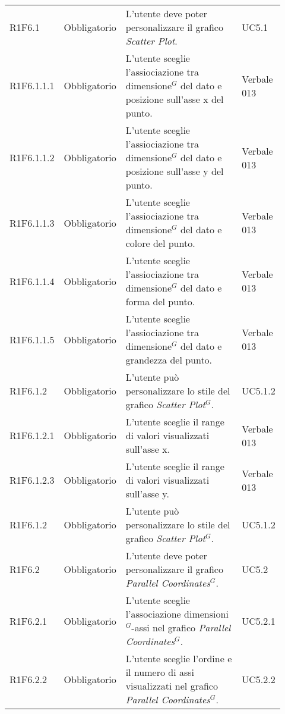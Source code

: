 {\begin{longtable}{p{0.12\linewidth}p{0.15\linewidth}p{0.50\linewidth}p{0.15\linewidth}}
    \rowcolor[RGB]{216, 235, 171}
    R1F6.1 & Obbligatorio & L'utente deve poter personalizzare il grafico \textit{Scatter Plot}. & UC5.1\\
    \rowcolor[RGB]{233, 245, 206}
    R1F6.1.1.1 & Obbligatorio & L'utente sceglie l'assiociazione tra dimensione$^{G}$ del dato e posizione sull'asse x del punto.& Verbale 013\\
    \rowcolor[RGB]{216, 235, 171}
    R1F6.1.1.2 & Obbligatorio & L'utente sceglie l'assiociazione tra dimensione$^{G}$ del dato e posizione sull'asse y del punto.& Verbale 013\\
    \rowcolor[RGB]{233, 245, 206}
    R1F6.1.1.3 & Obbligatorio & L'utente sceglie l'assiociazione tra dimensione$^{G}$ del dato e colore del punto.& Verbale 013\\
    \rowcolor[RGB]{216, 235, 171}
    R1F6.1.1.4 & Obbligatorio & L'utente sceglie l'assiociazione tra dimensione$^{G}$ del dato e forma del punto.& Verbale 013\\
    \rowcolor[RGB]{233, 245, 206}
    R1F6.1.1.5 & Obbligatorio & L'utente sceglie l'assiociazione tra dimensione$^{G}$ del dato e grandezza del punto.& Verbale 013\\
    \rowcolor[RGB]{216, 235, 171}
    R1F6.1.2 & Obbligatorio & L'utente può personalizzare lo stile del grafico \textit{Scatter Plot$^{G}$}. & UC5.1.2\\
    \rowcolor[RGB]{233, 245, 206}
    R1F6.1.2.1 & Obbligatorio & L'utente sceglie il range di valori visualizzati sull'asse x. & Verbale 013 \\
    \rowcolor[RGB]{216, 235, 171}
    R1F6.1.2.3 & Obbligatorio & L'utente sceglie il range di valori visualizzati sull'asse y. & Verbale 013 \\
    \rowcolor[RGB]{233, 245, 206}
    R1F6.1.2 & Obbligatorio & L'utente può personalizzare lo stile del grafico \textit{Scatter Plot$^{G}$}. & UC5.1.2\\
    \rowcolor[RGB]{216, 235, 171}
    R1F6.2 & Obbligatorio & L'utente deve poter personalizzare il grafico \textit{Parallel Coordinates$^{G}$}. & UC5.2\\
    \rowcolor[RGB]{233, 245, 206}
    R1F6.2.1 & Obbligatorio & L'utente sceglie l'associazione dimensioni$^{G}$-assi nel grafico \textit{Parallel Coordinates$^{G}$}. & UC5.2.1\\
    \rowcolor[RGB]{216, 235, 171}
    R1F6.2.2 & Obbligatorio & L'utente sceglie l'ordine e il numero di assi visualizzati nel grafico \textit{Parallel Coordinates$^{G}$}. & UC5.2.2\\

\end{longtable}}
